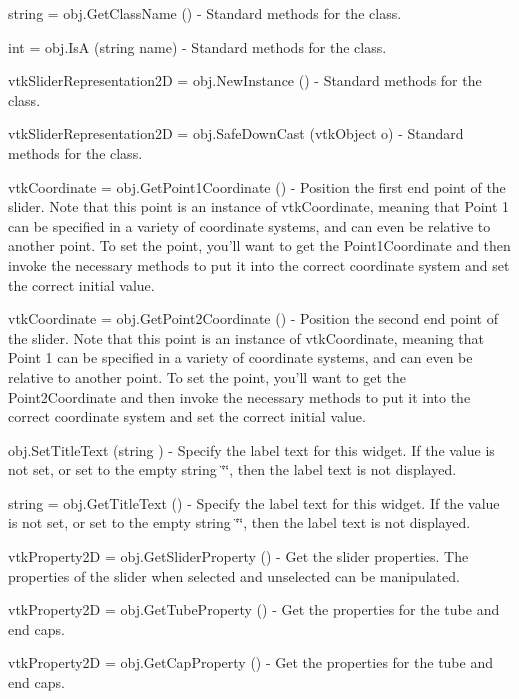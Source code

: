 \begin{DoxyItemize}
\item {\ttfamily string = obj.\-Get\-Class\-Name ()} -\/ Standard methods for the class.  
\item {\ttfamily int = obj.\-Is\-A (string name)} -\/ Standard methods for the class.  
\item {\ttfamily vtk\-Slider\-Representation2\-D = obj.\-New\-Instance ()} -\/ Standard methods for the class.  
\item {\ttfamily vtk\-Slider\-Representation2\-D = obj.\-Safe\-Down\-Cast (vtk\-Object o)} -\/ Standard methods for the class.  
\item {\ttfamily vtk\-Coordinate = obj.\-Get\-Point1\-Coordinate ()} -\/ Position the first end point of the slider. Note that this point is an instance of vtk\-Coordinate, meaning that Point 1 can be specified in a variety of coordinate systems, and can even be relative to another point. To set the point, you'll want to get the Point1\-Coordinate and then invoke the necessary methods to put it into the correct coordinate system and set the correct initial value.  
\item {\ttfamily vtk\-Coordinate = obj.\-Get\-Point2\-Coordinate ()} -\/ Position the second end point of the slider. Note that this point is an instance of vtk\-Coordinate, meaning that Point 1 can be specified in a variety of coordinate systems, and can even be relative to another point. To set the point, you'll want to get the Point2\-Coordinate and then invoke the necessary methods to put it into the correct coordinate system and set the correct initial value.  
\item {\ttfamily obj.\-Set\-Title\-Text (string )} -\/ Specify the label text for this widget. If the value is not set, or set to the empty string \char`\"{}\char`\"{}, then the label text is not displayed.  
\item {\ttfamily string = obj.\-Get\-Title\-Text ()} -\/ Specify the label text for this widget. If the value is not set, or set to the empty string \char`\"{}\char`\"{}, then the label text is not displayed.  
\item {\ttfamily vtk\-Property2\-D = obj.\-Get\-Slider\-Property ()} -\/ Get the slider properties. The properties of the slider when selected and unselected can be manipulated.  
\item {\ttfamily vtk\-Property2\-D = obj.\-Get\-Tube\-Property ()} -\/ Get the properties for the tube and end caps.  
\item {\ttfamily vtk\-Property2\-D = obj.\-Get\-Cap\-Property ()} -\/ Get the properties for the tube and end caps.  

\end{DoxyItemize}

